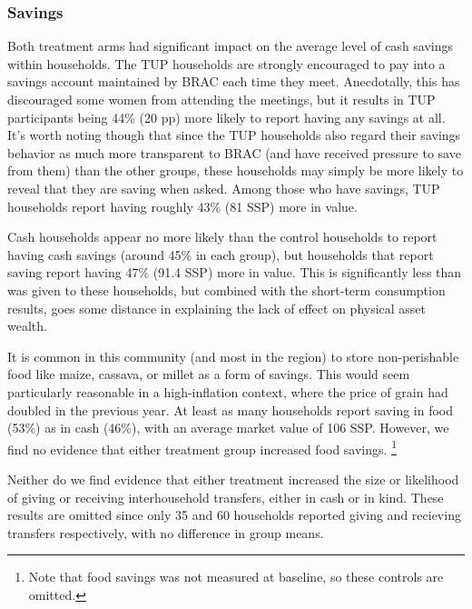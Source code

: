 \documentclass[12pt,article]{article}
\begin{document}
\subsubsection{Savings}
\label{sec:orgheadline11}

Both treatment arms had significant impact on the average level of cash savings
within households. The TUP households are strongly encouraged to pay into a savings
account maintained by BRAC each time they meet. Anecdotally, this has discouraged
some women from attending the meetings, but it results in TUP participants being 44\%
(20 pp) more likely to report having any savings at all. It's
worth noting though that since the TUP households also regard their savings behavior
as much more transparent to BRAC (and have received pressure to save from them) than
the other groups, these households may simply be more likely to reveal that they are
saving when asked. Among those who have savings, TUP households report having roughly
43\% (81 SSP) more in value.

Cash households appear no more likely than the control households to report having
cash savings (around 45\% in each group), but households that report saving report
having 47\% (91.4 SSP) more in value. This is significantly less than was given to
these households, but combined with the short-term consumption results, goes some
distance in explaining the lack of effect on physical asset wealth. 

It is common in this community (and most in the region) to store non-perishable food
like maize, cassava, or millet as a form of savings. This would seem particularly
reasonable in a high-inflation context, where the price of grain had doubled in the
previous year. At least as many households report saving in food (53\%) as in cash
(46\%), with an average market value of 106 SSP. However, we find no evidence that
either treatment group increased food savings. \footnote{Note that food savings was not
measured at baseline, so these controls are omitted.}

Neither do we find evidence that either treatment increased the size or likelihood of
giving or receiving interhousehold transfers, either in cash or in kind. These
results are omitted since only 35 and 60 households reported giving and recieving
transfers respectively, with no difference in group means.
\end{document}

